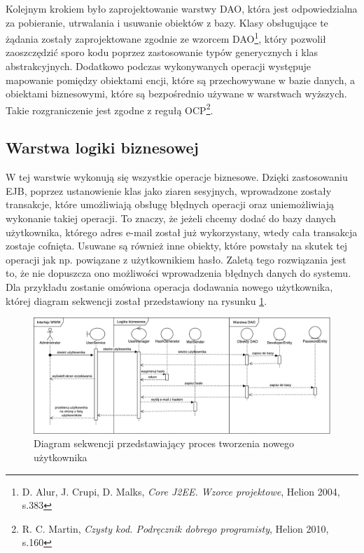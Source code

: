 Kolejnym krokiem było zaprojektowanie warstwy DAO, która jest odpowiedzialna za pobieranie, utrwalania i usuwanie obiektów z bazy. Klasy obsługujące te żądania zostały zaprojektowane zgodnie ze wzorcem DAO\footnote{D. Alur, J. Crupi, D. Malks, \textit{Core J2EE. Wzorce projektowe}, Helion 2004, s.383}, który pozwolił zaoszczędzić sporo kodu poprzez zastosowanie typów generycznych i klas abstrakcyjnych. Dodatkowo podczas wykonywanych operacji występuje mapowanie pomiędzy obiektami encji, które są przechowywane w bazie danych, a obiektami biznesowymi, które są bezpośrednio używane w warstwach wyższych. Takie rozgraniczenie jest zgodne z regułą OCP\footnote{R. C. Martin, \textit{Czysty kod. Podręcznik dobrego programisty}, Helion 2010, s.160}.


\subsection{Warstwa logiki biznesowej}
W tej warstwie wykonują się wszystkie operacje biznesowe. Dzięki zastosowaniu EJB, poprzez ustanowienie klas jako ziaren sesyjnych, wprowadzone zostały transakcje, które umożliwiają obsługę błędnych operacji oraz uniemożliwiają wykonanie takiej operacji. To znaczy, że jeżeli chcemy dodać do bazy danych użytkownika, którego adres e-mail został już wykorzystany, wtedy cała transakcja zostaje cofnięta. Usuwane są również inne obiekty, które powstały na skutek tej operacji jak np. powiązane z użytkownikiem hasło. Zaletą tego rozwiązania jest to, że nie dopuszcza ono możliwości wprowadzenia błędnych danych do systemu. Dla przykładu zostanie omówiona operacja dodawania nowego użytkownika, której diagram sekwencji został przedstawiony na rysunku \ref{fig:diagsekw}. 

\begin{figure}
	\centering
	\includegraphics[width=25cm]{rysunki/diagsekw.pdf}	
	\caption{Diagram sekwencji przedstawiający proces tworzenia nowego użytkownika}
	\label{fig:diagsekw}
\end{figure}

